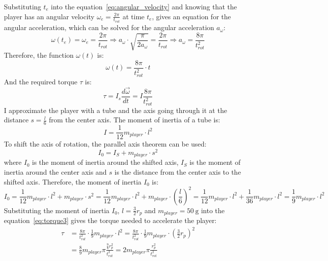 Substituting $t_e$ into the equation~\ref{eq:angular_velocity} and knowing that the player has an angular velocity $\omega_e=\frac{2\pi}{t_{rot}}$ at time $t_e$, gives an equation for the angular acceleration, which can be solved for the angular acceleration $a_\omega$:
\begin{equation}
    \label{eq:angular_acceleration}
    \omega(t_e) = \omega_e = \frac{2\pi}{t_{rot}} \Rightarrow a_{\omega} \cdot \sqrt {\frac{\pi}{2a_{\omega}}} = \frac{2\pi}{t_{rot}} \Rightarrow a_{\omega} = \frac{8\pi}{t_{rot}^2}
\end{equation}
Therefore, the function $\omega(t)$ is:
\begin{equation}
    \label{eq:angular_velocity_function}
    \omega(t) = \frac{8\pi}{t_{rot}^2} \cdot t
\end{equation}
And the required torque $\tau$ is:
\begin{equation}
    \label{eq:torque3}
    \tau = I_s \frac{d\vec{\omega}}{dt} = I \frac{8\pi}{t_{rot}^2}
\end{equation}
I approximate the player with a tube and the axis going through it at the distance $s=\frac{l}{6}$ from the center axis.
The moment of inertia of a tube is:
\begin{equation}
    \label{eq:moment_of_inertia}
    I = \frac{1}{12} m_{player} \cdot l^2
\end{equation}
To shift the axis of rotation, the parallel axis theorem can be used:
\begin{equation}
    \label{eq:parallel_axis_theorem}
    I_0 = I_{S} + m_{player} \cdot s^2
\end{equation}
where $I_0$ is the moment of inertia around the shifted axis, $I_{S}$ is the moment of inertia around the center axis and $s$ is the distance from the center axis to the shifted axis.
Therefore, the moment of inertia $I_0$ is:
\begin{equation}
    \label{eq:moment_of_inertia_shifted}
    I_0 = \frac{1}{12} m_{player} \cdot l^2 + m_{player} \cdot s^2 = \frac{1}{12} m_{player} \cdot l^2 + m_{player} \cdot \left(\frac{l}{6}\right)^2 = \frac{1}{12} m_{player} \cdot l^2 + \frac{1}{36} m_{player} \cdot l^2 = \frac{1}{9} m_{player} \cdot l^2
\end{equation}
Substituting the moment of inertia $I_0$, $l=\frac{3}{2}r_p$ and $m_{player}=\qty[per-mode=symbol]{50}{\g}$ into the equation~\ref{eq:torque3} gives the torque needed to accelerate the player:
\begin{equation}
    \label{eq:torque4}
    \begin{split}
        \tau &= \frac{8\pi}{t_{rot}^2} \cdot \frac{1}{9} m_{player} \cdot l^2 = \frac{8\pi}{t_{rot}^2} \cdot \frac{1}{9} m_{player} \cdot \left(\frac{3}{2}r_p\right)^2\\
        &= \frac{8}{9}m_{player}\pi\frac{\frac{9}{4}r_p^2}{t_{rot}^2}=2m_{player}\pi\frac{r_p^2}{t_{rot}^2}
    \end{split}
\end{equation}
